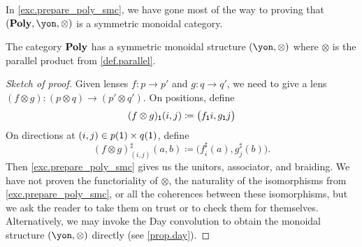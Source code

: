 \documentclass[Book-Poly]{subfiles}
\begin{document}
In \cref{exc.prepare_poly_smc}, we have gone most of the way to proving that $(\poly,\yon,\otimes)$ is a symmetric monoidal category.

\begin{proposition}\label{prop.parallel_monoidal}
The category $\mathbf{Poly}$ has a symmetric monoidal structure $(\yon,\otimes)$ where $\otimes$ is the parallel product from \cref{def.parallel}.
\end{proposition}
\begin{proof}[Sketch of proof]
Given lenses $f\colon p\to p'$ and $g\colon q\to q'$, we need to give a lens $(f\otimes g)\colon (p\otimes q)\to (p'\otimes q')$. On positions, define
\[
(f\otimes g)_{\textsf{1}}(i,j)\coloneqq \big(f_{\textsf{1}}i,g_{\textsf{1}}j\big)
\]
On directions at $(i,j)\in p(\textsf{1})\times q(\textsf{1})$, define
\[
  (f\otimes g)^\sharp_{(i,j)}(a,b)\coloneqq
  \big(f^\sharp_i(a),g^\sharp_j(b)\big).
\]
Then \cref{exc.prepare_poly_smc} gives us the unitors, associator, and braiding.
We have not proven the functoriality of $\otimes$, the naturality of the isomorphisms from \cref{exc.prepare_poly_smc}, or all the coherences between these isomorphisms, but we ask the reader to take them on trust or to check them for themselves.
Alternatively, we may invoke the Day convolution to obtain the monoidal structure $(\yon, \otimes)$ directly (see \cref{prop.day}).
\end{proof}
\end{document}
